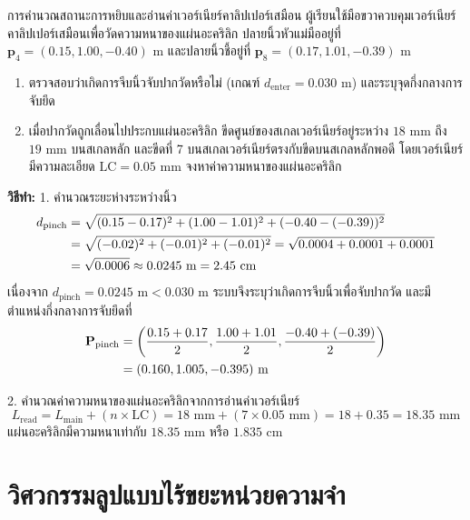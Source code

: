\begin{workedexamplebox}{การคำนวณสถานะการหยิบและอ่านค่าเวอร์เนียร์คาลิปเปอร์เสมือน}
ผู้เรียนใช้มือขวาควบคุมเวอร์เนียร์คาลิปเปอร์เสมือนเพื่อวัดความหนาของแผ่นอะคริลิก ปลายนิ้วหัวแม่มืออยู่ที่ $\mathbf{p}_4 = (0.15, 1.00, -0.40)\text{ m}$ และปลายนิ้วชี้อยู่ที่ $\mathbf{p}_8 = (0.17, 1.01, -0.39)\text{ m}$
\begin{enumerate}
    \item ตรวจสอบว่าเกิดการจีบนิ้วจับปากวัดหรือไม่ (เกณฑ์ $d_{\text{enter}} = 0.030\text{ m}$) และระบุจุดกึ่งกลางการจับยึด
    \item เมื่อปากวัดถูกเลื่อนไปประกบแผ่นอะคริลิก ขีดศูนย์ของสเกลเวอร์เนียร์อยู่ระหว่าง $18\text{ mm}$ ถึง $19\text{ mm}$ บนสเกลหลัก และขีดที่ 7 บนสเกลเวอร์เนียร์ตรงกับขีดบนสเกลหลักพอดี โดยเวอร์เนียร์มีความละเอียด $\text{LC} = 0.05\text{ mm}$ จงหาค่าความหนาของแผ่นอะคริลิก
\end{enumerate}

\textbf{วิธีทำ:}
1. คำนวณระยะห่างระหว่างนิ้ว
\begin{align}
d_{\text{pinch}} &= \sqrt{(0.15 - 0.17)^2 + (1.00 - 1.01)^2 + (-0.40 - (-0.39))^2} \notag \\
&= \sqrt{(-0.02)^2 + (-0.01)^2 + (-0.01)^2} = \sqrt{0.0004 + 0.0001 + 0.0001} \notag \\
&= \sqrt{0.0006} \approx 0.0245\text{ m} = 2.45\text{ cm}
\end{align}
เนื่องจาก $d_{\text{pinch}} = 0.0245\text{ m} < 0.030\text{ m}$ ระบบจึงระบุว่าเกิดการจีบนิ้วเพื่อจับปากวัด และมีตำแหน่งกึ่งกลางการจับยึดที่
\begin{align}
\mathbf{P}_{\text{pinch}} &= \left(\frac{0.15 + 0.17}{2}, \frac{1.00 + 1.01}{2}, \frac{-0.40 + (-0.39)}{2}\right) \notag \\
&= (0.160, 1.005, -0.395)\text{ m}
\end{align}

2. คำนวณค่าความหนาของแผ่นอะคริลิกจากการอ่านค่าเวอร์เนียร์
\begin{equation}
L_{\text{read}} = L_{\text{main}} + (n \times \text{LC}) = 18\text{ mm} + (7 \times 0.05\text{ mm}) = 18 + 0.35 = 18.35\text{ mm}
\end{equation}
แผ่นอะคริลิกมีความหนาเท่ากับ $18.35\text{ mm}$ หรือ $1.835\text{ cm}$
\end{workedexamplebox}

\section{วิศวกรรมลูปแบบไร้ขยะหน่วยความจำ}

